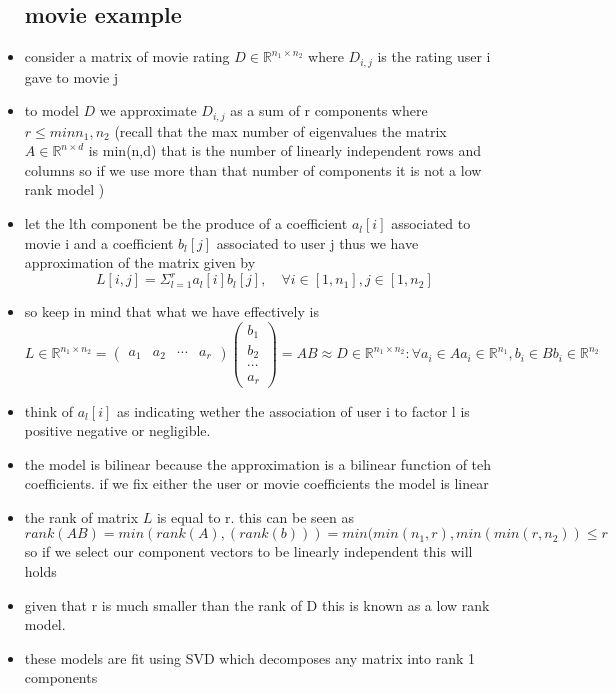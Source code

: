 \documentclass{article}
\begin{document}
\begin{itemize}
\subsection*{movie example}
\item consider a matrix of movie rating $D\in \mathbb{R}^{n_1\times n_2}$ where $D_{i,j}$ is the rating user i gave to movie j 
\item to model $D$ we approximate $D_{i,j}$ as a sum of r components where $r\leq min{n_1,n_2}$ (recall that the max number of 
eigenvalues the matrix $A\in \mathbb{R}^{n\times d}$ is min(n,d) that is the number of linearly independent rows and columns so if we use more than that number of components it is not a low rank model )
\item let the lth component be the produce of a coefficient $a_{l}[i]$ associated to movie i and a coefficient $b_{l}[j]$ associated to user j thus we have 
approximation of the matrix given by $$L[i,j]=\Sigma_{l=1}^{r}a_{l}[i]b_{l}[j], \quad \forall i\in [1,n_1], j\in [1,n_2]$$
\item so keep in mind that what we have effectively is $$L\in \mathbb{R}^{n_1\times n_2}=
\begin{pmatrix}
a_1 & a_2 & \cdots & a_r    
\end{pmatrix}\begin{pmatrix}
    b_1 \\ b_2  \\ \cdots \\ a_r    
    \end{pmatrix}=AB\approx D\in \mathbb{R}^{n_1\times n_2}: \forall a_i\in A a_i\in \mathbb{R}^{n_1},b_i\in B b_i\in \mathbb{R}^{n_2}$$
\item think of $a_{l}[i]$ as indicating wether the association of user i to factor l is positive negative or negligible. 
\item the model is bilinear because the approximation is a bilinear function of teh coefficients. if we fix either the user or movie coefficients the model is linear 
\item the rank of matrix $L$ is equal to r. this can be seen as $rank(AB)=min(rank(A), (rank(b)))=min(min(n_1,r), min(min(r,n_2))\leq r$ so if we select our component vectors to be linearly independent this will holds
\item given that r is much smaller than the rank of D this is known as a low rank model. 
\item these models are fit using SVD which decomposes any matrix into rank 1 components

\end{itemize}
\end{document}
